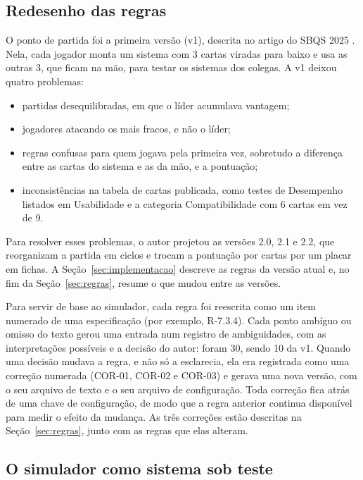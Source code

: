 \subsection{Redesenho das regras}

O ponto de partida foi a primeira versão (v1), descrita no artigo do SBQS 2025 \cite{oliveira2025critical}. Nela,
cada jogador monta um sistema com 3 cartas viradas para baixo e usa as outras 3, que ficam na mão, para testar os
sistemas dos colegas. A v1 deixou quatro problemas:
\begin{itemize}
  \item partidas desequilibradas, em que o líder acumulava vantagem;
  \item jogadores atacando os mais fracos, e não o líder;
  \item regras confusas para quem jogava pela primeira vez, sobretudo a diferença entre as cartas do sistema e
    as da mão, e a pontuação;
  \item inconsistências na tabela de cartas publicada, como testes de Desempenho listados em Usabilidade e a
    categoria Compatibilidade com 6 cartas em vez de 9.
\end{itemize}

Para resolver esses problemas, o autor projetou as versões 2.0, 2.1 e 2.2, que reorganizam a partida em ciclos
e trocam a pontuação por cartas por um placar em fichas. A Seção~\ref{sec:implementacao} descreve as regras da
versão atual e, no fim da Seção~\ref{sec:regras}, resume o que mudou entre as versões.

Para servir de base ao simulador, cada regra foi reescrita como um item numerado de uma especificação
(por exemplo, R-7.3.4). Cada ponto ambíguo ou omisso do texto gerou uma entrada num registro de
ambiguidades, com as interpretações possíveis e a decisão do autor: foram 30, sendo 10 da v1. Quando uma decisão
mudava a regra, e não só a esclarecia, ela era registrada como uma correção numerada (COR-01, COR-02 e
COR-03) e gerava uma nova versão, com o seu
arquivo de texto e o seu arquivo de configuração. Toda correção fica atrás de uma chave de configuração, de modo
que a regra anterior continua disponível para medir o efeito da mudança. As três correções estão descritas na
Seção~\ref{sec:regras}, junto com as regras que elas alteram.

\subsection{O simulador como sistema sob teste}

